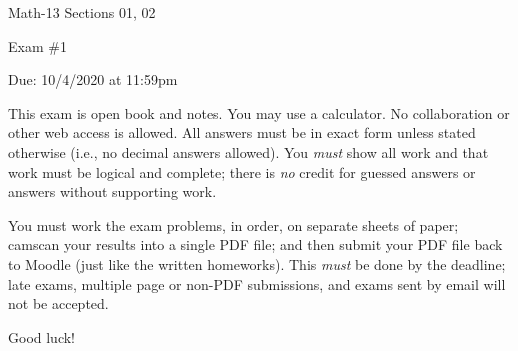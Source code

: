 \documentclass[letterpaper,12pt,fleqn]{article}
\begin{document}
\begin{center}
  \large
  Math-13 Sections 01, 02

  \Large
  Exam \#1

  Due: 10/4/2020 at 11:59pm
\end{center}

\vspace{0.5in}

This exam is open book and notes.  You may use a calculator.  No collaboration or other web access is allowed. All
answers must be in exact form unless stated otherwise (i.e., no decimal answers allowed).  You \emph{must} show all
work and that work must be logical and complete; there is \emph{no} credit for guessed answers or answers without
supporting work.

You must work the exam problems, in order, on separate sheets of paper; camscan your results into a single PDF
file; and then submit your PDF file back to Moodle (just like the written homeworks).  This \emph{must} be done by
the deadline; late exams, multiple page or non-PDF submissions, and exams sent by email will not be accepted.

Good luck!

\vspace{0.5in}
\end{document}
